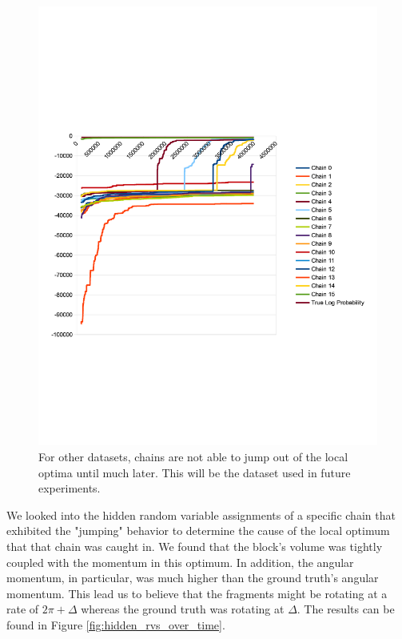 \documentclass[runningheads]{llncs}
\begin{document}
\begin{figure}[t]
\begin{center}
   \includegraphics[width=0.8\linewidth]{figs/random-walk-metropolis-jump-slow.png}
\end{center}
   \caption{For other datasets, chains are not able to jump out of the local 
        optima until much later. This will be the dataset used in future 
        experiments.}
\label{fig:random-walk-metropolis-jump-slow}
\end{figure}

We looked into the hidden random variable assignments of a specific chain that exhibited the "jumping" behavior to 
determine the cause of the local optimum that that chain was caught in. We found 
that the block's volume was tightly coupled with the momentum in this optimum. 
In addition, the angular momentum, in particular, was much higher than the 
ground truth's angular momentum. This lead us to believe that the fragments 
might be rotating at a rate of $2\pi + \Delta$ whereas the ground truth was 
rotating at $\Delta$. The results can be found in Figure \ref{fig:hidden_rvs_over_time}.
\end{document}
